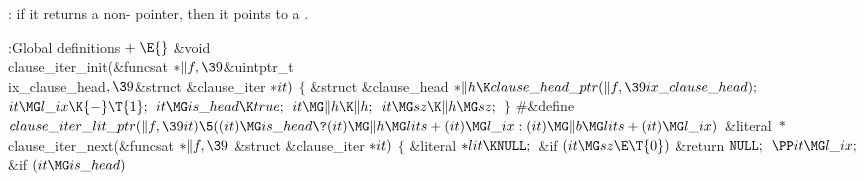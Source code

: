 \li {}: if it returns a non-\PB{$\NULL$} pointer, then
it points to a
.
\endunorderedlist

\Y\B\4:Global definitions\X${}\mathrel+\E{}$\6
\&{void} \\{clause\_iter\_init}(\&{funcsat} ${}{*}\|f,\39{}$\&{uintptr\_t} %
\\{ix\_clause\_head}${},\39{}$\&{struct} \&{clause\_iter} ${}{*}\\{it}){}$\1\1%
\2\2\6
${}\{{}$\1\6
\&{struct} \&{clause\_head} ${}{*}\|h\K\\{clause\_head\_ptr}(\|f,\39\\{ix%
\_clause\_head});{}$\7
${}\\{it}\MG\\{l\_ix}\K{-}\T{1};{}$\6
${}\\{it}\MG\\{is\_head}\K\\{true};{}$\6
${}\\{it}\MG\|h\K\|h;{}$\6
${}\\{it}\MG\\{sz}\K\|h\MG\\{sz};{}$\6
\4${}\}{}$\2\6
\8\#\&{define} ${}\\{clause\_iter\_lit\_ptr}(\|f,\39\\{it}) \5((\\{it})\MG\\{is%
\_head}\?(\\{it})\MG\|h\MG\\{lits}+(\\{it})\MG\\{l\_ix}:(\\{it})\MG\|b\MG%
\\{lits}+(\\{it})\MG\\{l\_ix}){}$\7
\&{literal} ${}{*}{}$\\{clause\_iter\_next}(\&{funcsat} ${}{*}\|f,\39{}$%
\&{struct} \&{clause\_iter} ${}{*}\\{it}){}$\1\1\2\2\6
${}\{{}$\1\6
\&{literal} ${}{*}\\{lit}\K\NULL;{}$\7
\&{if} ${}(\\{it}\MG\\{sz}\E\T{0}){}$\1\5
\&{return} ${}{\tt NULL};{}$\2\6
${}\PP\\{it}\MG\\{l\_ix};{}$\6
\&{if} ${}(\\{it}\MG\\{is\_head}){}$\5
